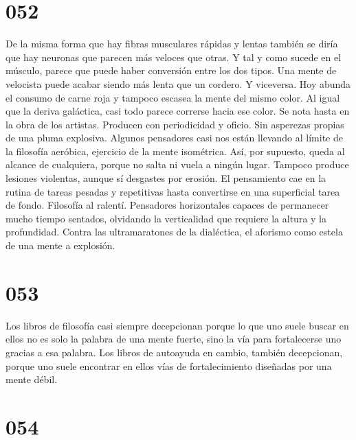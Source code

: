 \documentclass[a4paper,11pt,openright,twocolumn]{book}
\begin{document}
\section*{052}

De la misma forma que hay fibras musculares rápidas y lentas también se diría que hay neuronas que parecen más veloces que otras. Y tal y como sucede en el músculo, parece que puede haber conversión entre los dos tipos. Una mente de velocista puede acabar siendo más lenta que un cordero. Y viceversa. Hoy abunda el consumo de carne roja y tampoco escasea la mente del mismo color. Al igual que la deriva galáctica, casi todo parece correrse hacia ese color. Se nota hasta en la obra de los artistas. Producen con periodicidad y oficio. Sin asperezas propias de una pluma explosiva. Algunos pensadores casi nos están llevando al límite de la filosofía aeróbica, ejercicio de la mente isométrica. Así, por supuesto, queda al alcance de cualquiera, porque no salta ni vuela a ningún lugar. Tampoco produce lesiones violentas, aunque sí desgastes por erosión. El pensamiento cae en la rutina de tareas pesadas y repetitivas hasta convertirse en una superficial tarea de fondo. Filosofía al ralentí. Pensadores horizontales capaces de permanecer mucho tiempo sentados, olvidando la verticalidad que requiere la altura y la profundidad. Contra las ultramaratones de la dialéctica, el aforismo como estela de una mente a explosión.

\section*{053}

Los libros de filosofía casi siempre decepcionan porque lo que uno suele buscar en ellos no es solo la palabra de una mente fuerte, sino la vía para fortalecerse uno gracias a esa palabra. Los libros de autoayuda en cambio, también decepcionan, porque uno suele encontrar en ellos vías de fortalecimiento diseñadas por una mente débil. 


\section*{054}
\end{document}

